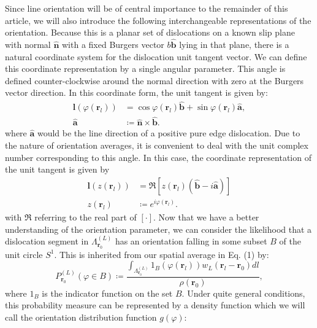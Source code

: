 Since line orientation will be of central importance to the remainder of this article, we will also introduce the following interchangeable representations of the orientation. Because this is a planar set of dislocations on a known slip plane with normal \(\hat{\boldsymbol{n}}\) with a fixed Burgers vector  \(b\hat{\boldsymbol{b}}\) lying in that plane, there is a natural coordinate system for the dislocation unit tangent vector. We can define this coordinate representation by a single angular parameter. This angle is defined counter-clockwise around the normal direction with zero at the Burgers vector direction. In this coordinate form, the unit tangent is given by:
\begin{subequations}
    \begin{align}
    \boldsymbol{l}\left( \varphi\left( \boldsymbol{r}_{l} \right) \right)&=\cos{\varphi\left( \boldsymbol{r}_{l} \right)}\hat{\boldsymbol{b}} + \sin{\varphi\left( \boldsymbol{r}_{l} \right)}\hat{\boldsymbol{a}},\label{eq:orientationDef}\\
    \hat{\boldsymbol{a}}&\coloneqq\hat{\boldsymbol{n}}\times\hat{\boldsymbol{b}}.
\end{align}
\end{subequations}
where \(\hat{\boldsymbol{a}}\) would be the line direction of a positive pure edge dislocation. Due to the nature of orientation averages, it is convenient to deal with the unit complex number corresponding to this angle. In this case, the coordinate representation of the unit tangent is given by
\begin{subequations}\label{eq:orientationExponential}
    \begin{align}
\boldsymbol{l}\left( z\left( \boldsymbol{r}_{l} \right) \right)&=\Re\left[ z\left( \boldsymbol{r}_{l} \right)\left( \hat{\boldsymbol{b}} - i\hat{\boldsymbol{a}} \right) \right] \label{eq:zdir}\\
z\left( \boldsymbol{r}_{l} \right) &\coloneqq e^{i\varphi\left( \boldsymbol{r}_{l} \right)}.
\end{align}
\end{subequations}
with $\Re$ referring to the real part of $\left[\cdot \right] $. Now that we have a better understanding of the orientation parameter, we can consider the likelihood that a dislocation segment in \(\Lambda_{\boldsymbol{r}_{0}}^{(L)}\) has an orientation falling in some subset $B$ of the unit circle \(S^{1}\). This is inherited from our spatial average in Eq. (1) by:
\begin{equation}P_{\boldsymbol{r}_{0}}^{(L)}\left( \varphi \in  B  \right) \coloneqq \frac{\int_{\Lambda_{\boldsymbol{r}_{0}}^{(L)}}^{}{1_{B}\left( \varphi\left( \boldsymbol{r}_{l} \right) \right)w_{L}\left( \boldsymbol{r}_{l} - \boldsymbol{r}_{0} \right)dl}}{\rho\left( \boldsymbol{r}_{0} \right)}, \end{equation}
where $1_{B}$ is the indicator function on the set $B$. Under quite general conditions, this probability measure can be
represented by a density function which we will call the orientation
distribution function $g(\varphi)$:

